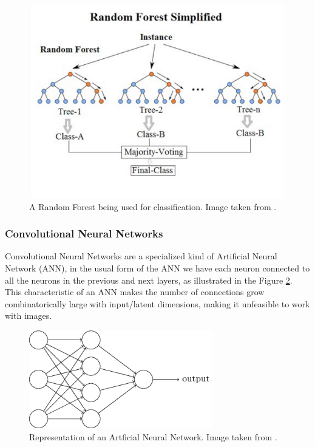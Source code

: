 \begin{figure}[H]
    \includegraphics[width=\textwidth]{Cap2-Methods/Random_forest_diagram_complete.png}
    \centering
	\caption{A Random Forest being used for classification. Image taken from \cite{randomimg}.}
	\label{random}
\end{figure}

\subsubsection{Convolutional Neural Networks}

Convolutional Neural Networks are a specialized kind of Artificial Neural Network (ANN), in the usual form of the ANN we have each neuron connected to all the neurons in the previous and next layers, as illustrated in the Figure \ref{ann}. This characteristic of an ANN makes the number of connections grow combinatorically large with input/latent dimensions, making it unfeasible to work with images.

\begin{figure}[H]
    \includegraphics[width=8cm]{Cap2-Methods/rede.png}
    \centering
	\caption{Representation of an Artficial Neural Network. Image taken from \cite{neuralimg}.}
	\label{ann}
\end{figure}

